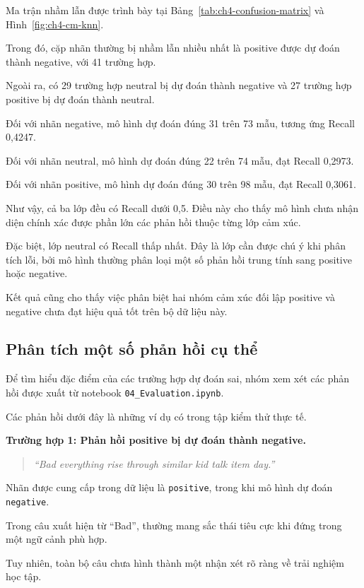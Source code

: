 Ma trận nhầm lẫn được trình bày tại
Bảng~\ref{tab:ch4-confusion-matrix}
và Hình~\ref{fig:ch4-cm-knn}.

Trong đó, cặp nhãn thường bị nhầm lẫn
nhiều nhất là positive được dự đoán thành
negative, với 41 trường hợp.

Ngoài ra, có 29 trường hợp neutral bị dự
đoán thành negative và 27 trường hợp
positive bị dự đoán thành neutral.

Đối với nhãn negative, mô hình dự đoán
đúng 31 trên 73 mẫu, tương ứng Recall
0,4247.

Đối với nhãn neutral, mô hình dự đoán
đúng 22 trên 74 mẫu, đạt Recall 0,2973.

Đối với nhãn positive, mô hình dự đoán
đúng 30 trên 98 mẫu, đạt Recall 0,3061.

Như vậy, cả ba lớp đều có Recall dưới 0,5.
Điều này cho thấy mô hình chưa nhận diện
chính xác được phần lớn các phản hồi
thuộc từng lớp cảm xúc.

Đặc biệt, lớp neutral có Recall thấp nhất.
Đây là lớp cần được chú ý khi phân tích lỗi,
bởi mô hình thường phân loại một số phản
hồi trung tính sang positive hoặc negative.

Kết quả cũng cho thấy việc phân biệt
hai nhóm cảm xúc đối lập positive và negative
chưa đạt hiệu quả tốt trên bộ dữ liệu này.


\subsection{Phân tích một số phản hồi cụ thể}

Để tìm hiểu đặc điểm của các trường hợp
dự đoán sai, nhóm xem xét các phản hồi
được xuất từ notebook
\texttt{04\_Evaluation.ipynb}.

Các phản hồi dưới đây là những ví dụ
có trong tập kiểm thử thực tế.

\textbf{Trường hợp 1: Phản hồi positive bị dự
đoán thành negative.}

\begin{quote}
\textit{``Bad everything rise through similar
kid talk item day.''}
\end{quote}

Nhãn được cung cấp trong dữ liệu là
\texttt{positive}, trong khi mô hình
dự đoán \texttt{negative}.

Trong câu xuất hiện từ ``Bad'', thường
mang sắc thái tiêu cực khi đứng trong
một ngữ cảnh phù hợp.

Tuy nhiên, toàn bộ câu chưa hình thành
một nhận xét rõ ràng về trải nghiệm học tập.

